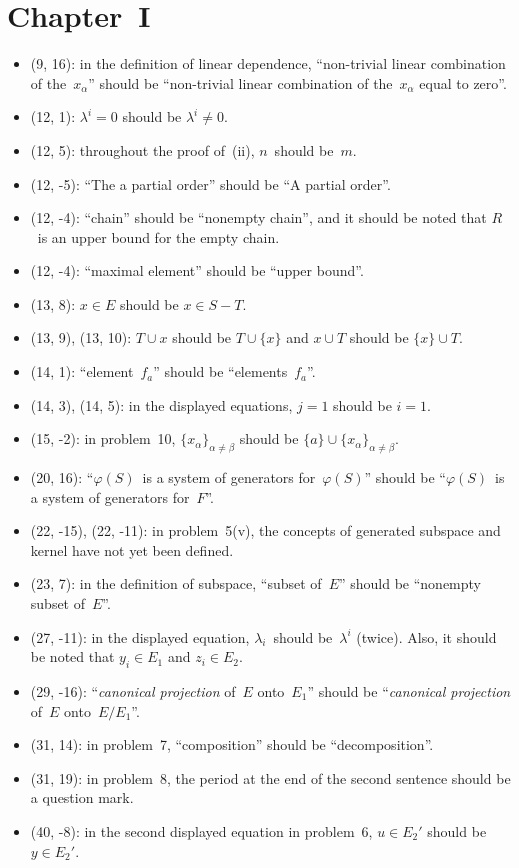 \documentclass[letterpaper,12pt]{article}
\newcommand{\union}{\cup}
\begin{document}
\section*{Chapter~I}
\begin{itemize}
\item (9, 16): in the definition of linear dependence, ``non-trivial linear combination of the~\(x_{\alpha}\)'' should be ``non-trivial linear combination of the~\(x_{\alpha}\) equal to zero''.
\item (12, 1): \(\lambda^i=0\) should be \(\lambda^i\ne 0\).
\item (12, 5): throughout the proof of~(ii), \(n\)~should be~\(m\).
\item (12, -5): ``The a partial order'' should be ``A partial order''.
\item (12, -4): ``chain'' should be ``nonempty chain'', and it should be noted that \(R\)~is an upper bound for the empty chain.
\item (12, -4): ``maximal element'' should be ``upper bound''.
\item (13, 8): \(x\in E\) should be \(x\in S-T\).
\item (13, 9), (13, 10): \(T\union x\) should be \(T\union\{x\}\) and \(x\union T\) should be \(\{x\}\union T\).
\item (14, 1): ``element~\(f_a\)'' should be ``elements~\(f_a\)''.
\item (14, 3), (14, 5): in the displayed equations, \(j=1\) should be \(i=1\).
\item (15, -2): in problem~10, \(\{x_{\alpha}\}_{\alpha\ne\beta}\) should be \(\{a\}\union\{x_{\alpha}\}_{\alpha\ne\beta}\).
\item (20, 16): ``\(\varphi(S)\)~is a system of generators for~\(\varphi(S)\)'' should be ``\(\varphi(S)\)~is a system of generators for~\(F\)''.
\item (22, -15), (22, -11): in problem~5(v), the concepts of generated subspace and kernel have not yet been defined.
\item (23, 7): in the definition of subspace, ``subset of~\(E\)'' should be ``nonempty subset of~\(E\)''.
\item (27, -11): in the displayed equation, \(\lambda_i\)~should be~\(\lambda^i\) (twice). Also, it should be noted that \(y_i\in E_1\) and \(z_i\in E_2\).
\item (29, -16): ``\emph{canonical projection} of~\(E\) onto~\(E_1\)'' should be ``\emph{canonical projection} of~\(E\) onto~\(E/E_1\)''.
\item (31, 14): in problem~7, ``composition'' should be ``decomposition''.
\item (31, 19): in problem~8, the period at the end of the second sentence should be a question mark.
\item (40, -8): in the second displayed equation in problem~6, \(u\in E_2'\) should be \(y\in E_2'\).
\end{itemize}
\end{document}
